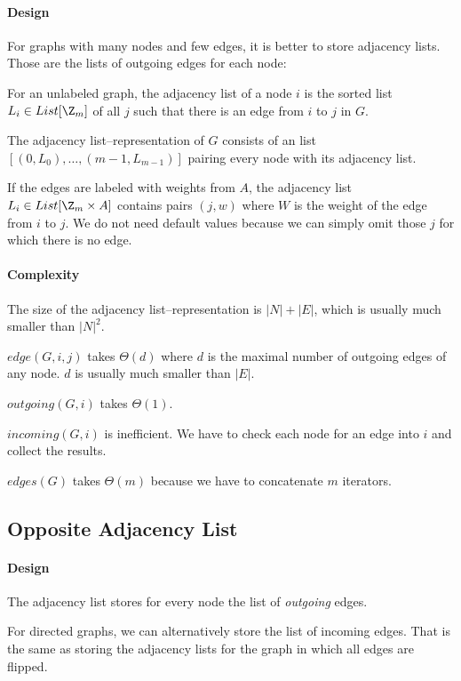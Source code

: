 \paragraph{Design}
For graphs with many nodes and few edges, it is better to store adjacency lists.
Those are the lists of outgoing edges for each node:

\begin{definition}
For an unlabeled graph, the adjacency list of a node $i$ is the sorted list $L_i\in List[\Z_m]$ of all $j$ such that there is an edge from $i$ to $j$ in $G$.

The adjacency list--representation of $G$ consists of an list $[(0,L_0),\ldots,(m-1,L_{m-1})]$ pairing every node with its adjacency list.
\end{definition}

If the edges are labeled with weights from $A$, the adjacency list $L_i\in List[\Z_m\times A]$ contains pairs $(j,w)$ where $W$ is the weight of the edge from $i$ to $j$.
We do not need default values because we can simply omit those $j$ for which there is no edge.

\paragraph{Complexity}
The size of the adjacency list--representation is $|N|+|E|$, which is usually much smaller than $|N|^2$.

$edge(G,i,j)$ takes $\Theta(d)$ where $d$ is the maximal number of outgoing edges of any node.
$d$ is usually much smaller than $|E|$.

$outgoing(G,i)$ takes $\Theta(1)$.

$incoming(G,i)$ is inefficient. We have to check each node for an edge into $i$ and collect the results.

$edges(G)$ takes $\Theta(m)$ because we have to concatenate $m$ iterators.

\subsection{Opposite Adjacency List}

\paragraph{Design}
The adjacency list stores for every node the list of \emph{outgoing} edges.

For directed graphs, we can alternatively store the list of incoming edges.
That is the same as storing the adjacency lists for the graph in which all edges are flipped.

